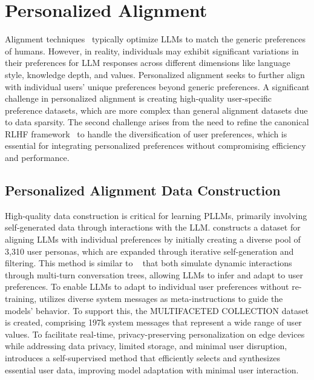 \section{Personalized Alignment}
\label{sec: personalized alignment}

Alignment techniques~\citep{bai2022training,rafailov2024direct} typically optimize LLMs to match the generic preferences of humans. However, in reality, individuals may exhibit significant variations in their preferences for LLM responses across different dimensions like language style, knowledge depth, and values. Personalized alignment seeks to further align with individual users’ unique preferences beyond generic preferences. 
A significant challenge in personalized alignment is creating high-quality user-specific preference datasets, which are more complex than general alignment datasets due to data sparsity. The second challenge arises from the need to refine the canonical RLHF framework~\citep{ouyang2022training} to handle the diversification of user preferences, which is essential for integrating personalized preferences without compromising efficiency and performance.

\subsection{Personalized Alignment Data Construction}
\label{subsec:data}

High-quality data construction is critical for learning PLLMs, primarily involving self-generated data through interactions with the LLM. \cite{wu2024aligning} constructs a dataset for aligning LLMs with individual preferences by initially creating a diverse pool of 3,310 user personas, which are expanded through iterative self-generation and filtering.  This method is similar to ~\citep{magister2024way} 
that both simulate dynamic interactions through multi-turn conversation trees, allowing LLMs to infer and adapt to user preferences. To enable LLMs to adapt to individual user preferences without re-training, \cite{lee2024aligning} utilizes diverse system messages as meta-instructions to guide the models' behavior. To support this, the MULTIFACETED COLLECTION dataset is created, comprising 197k system messages that represent a wide range of user values. To facilitate real-time, privacy-preserving personalization on edge devices while addressing data privacy, limited storage, and minimal user disruption, \cite{qin2024enabling} introduces a self-supervised method that efficiently selects and synthesizes essential user data, improving model adaptation with minimal user interaction.

